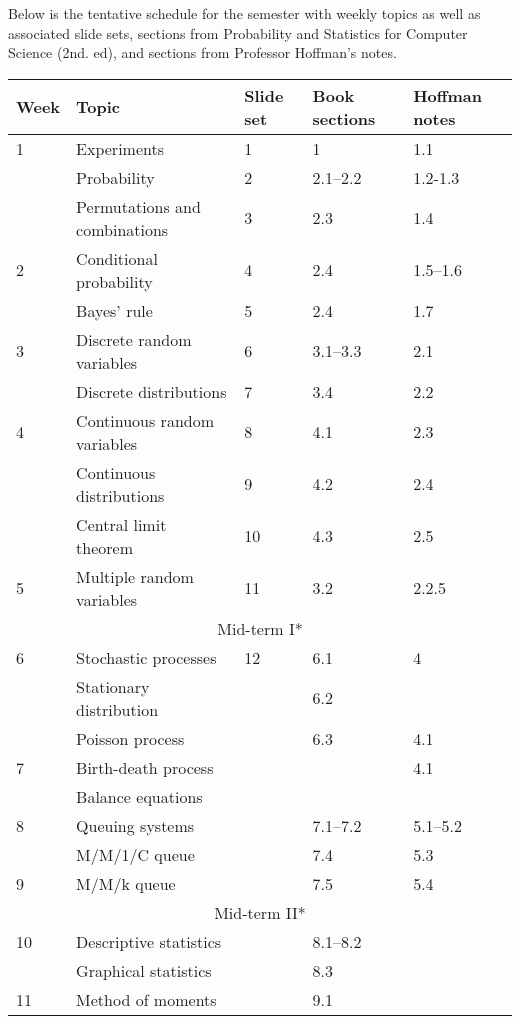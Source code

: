 \documentclass[10pt]{article}
\begin{document}
\pagestyle{fancy} 

Below is the tentative schedule for the semester with weekly topics as well as associated slide sets, sections from Probability and Statistics for Computer Science (2nd. ed), and sections from Professor Hoffman's notes.

\begin{center}
\begin{tabular}{|l|l|l|l|l|}
\hline
Week & Topic & Slide set & Book sections & Hoffman notes \\
\hline
1 & Experiments & 1 & 1 & 1.1 \\
& Probability & 2  & 2.1--2.2 & 1.2-1.3 \\
& Permutations and combinations & 3 & 2.3 & 1.4 \\
\hline
2 & Conditional probability & 4 & 2.4 & 1.5--1.6 \\
& Bayes' rule & 5 & 2.4 & 1.7 \\
\hline
3 & Discrete random variables & 6 & 3.1--3.3 & 2.1\\
& Discrete distributions & 7 & 3.4 & 2.2 \\
\hline
4 & Continuous random variables & 8 & 4.1 & 2.3 \\
& Continuous distributions & 9 & 4.2 & 2.4 \\
& Central limit theorem & 10 & 4.3 & 2.5 \\
\hline 
5 & Multiple random variables & 11 & 3.2 & 2.2.5 \\
\hline
\hline
\multicolumn{5}{|c|}{Mid-term I*} \\
\hline
\hline
6 & Stochastic processes & 12 & 6.1 & 4 \\
& Stationary distribution &  & 6.2 & \\
& Poisson process &  & 6.3 & 4.1 \\
\hline
7 & Birth-death process &   & & 4.1 \\
& Balance equations &  & & \\
\hline
8 & Queuing systems &  & 7.1--7.2 & 5.1--5.2 \\
& M/M/1/C queue &  & 7.4 & 5.3 \\
\hline
9 & M/M/k queue &  & 7.5 & 5.4 \\
\hline
\hline
\multicolumn{5}{|c|}{Mid-term II*} \\
\hline
\hline
10 & Descriptive statistics &  & 8.1--8.2 & \\
& Graphical statistics &  & 8.3 & \\
\hline 
11 & Method of moments &  & 9.1 & \\

\end{tabular}
\end{center}
\end{document}
